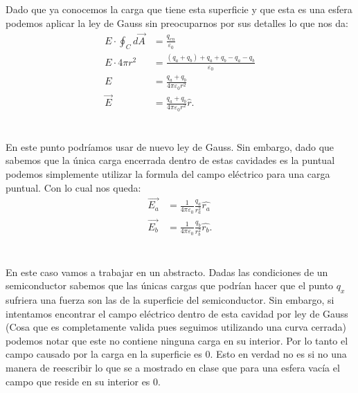 \documentclass{report}
\begin{document}
\section{}

Dado que ya conocemos la carga que tiene esta superficie y que esta es una esfera podemos aplicar la ley de Gauss sin preocuparnos por sus detalles lo que nos da:
\begin{align*}
  E \cdot \oint_{C} d\vec{A} &= \frac{q_{en}}{\varepsilon_0} \\ 
  E \cdot 4 \pi r^2 &= \frac{\left( q_a + q_b \right) + q_a + q_b - q_a - q_b}{\varepsilon_0} \\
  E &= \frac{q_a + q_b}{4\pi \varepsilon_0 r^2} \\
  \vec{E} &= \frac{q_a + q_b}{4\pi \varepsilon_0 r^2} \hat{r}
.\end{align*}

\section{}

En este punto podríamos usar de nuevo ley de Gauss. Sin embargo, dado que sabemos que la única carga encerrada dentro de estas cavidades es la puntual podemos simplemente utilizar la formula del campo eléctrico para una carga puntual. Con lo cual nos queda:
\begin{align*}
  \vec{E_a} &= \frac{1}{4\pi\varepsilon_0}\frac{q_a}{r_a^2}\hat{r_a} \\
  \vec{E_b} &= \frac{1}{4\pi\varepsilon_0}\frac{q_b}{r_b^2}\hat{r_b}
.\end{align*}

\section{}

En este caso vamos a trabajar en un abstracto. Dadas las condiciones de un semiconductor sabemos que las únicas cargas que podrían hacer que el punto $q_x$ sufriera una fuerza son las de la superficie del semiconductor. Sin embargo, si intentamos encontrar el campo eléctrico dentro de esta cavidad por ley de Gauss (Cosa que es completamente valida pues seguimos utilizando una curva cerrada) podemos notar que este no contiene ninguna carga en su interior. Por lo tanto el campo causado por la carga en la superficie es 0. Esto en verdad no es si no una manera de reescribir lo que se a mostrado en clase que para una esfera vacía el campo que reside en su interior es 0.
\end{document}
